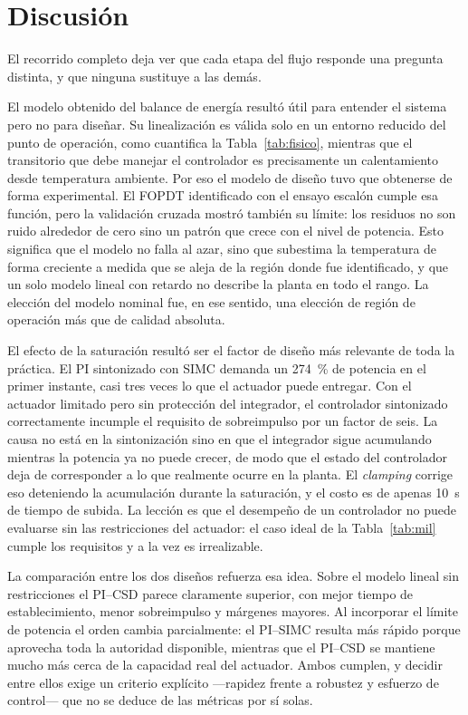 \section{Discusión}

El recorrido completo deja ver que cada etapa del flujo responde una pregunta distinta, y que
ninguna sustituye a las demás.

El modelo obtenido del balance de energía resultó útil para entender el sistema pero no para
diseñar. Su linealización es válida solo en un entorno reducido del punto de operación, como
cuantifica la Tabla~\ref{tab:fisico}, mientras que el transitorio que debe manejar el controlador
es precisamente un calentamiento desde temperatura ambiente. Por eso el modelo de diseño tuvo que
obtenerse de forma experimental. El FOPDT identificado con el ensayo escalón cumple
esa función, pero la validación cruzada mostró también su límite: los residuos no son ruido
alrededor de cero sino un patrón que crece con el nivel de potencia. Esto significa que el modelo no
falla al azar, sino que subestima la temperatura de forma creciente a medida que se aleja de la
región donde fue identificado, y que un solo modelo lineal con retardo no describe la planta en todo
el rango. La elección del modelo nominal fue, en ese sentido, una elección de región de operación
más que de calidad absoluta.

El efecto de la saturación resultó ser el factor de diseño más relevante de toda la práctica. El PI
sintonizado con SIMC demanda un \SI{274}{\percent} de potencia en el primer instante, casi tres
veces lo que el actuador puede entregar. Con el actuador limitado pero sin protección del
integrador, el controlador sintonizado correctamente incumple el requisito de sobreimpulso por un
factor de seis. La causa no está en la sintonización sino en que el integrador sigue acumulando
mientras la potencia ya no puede crecer, de modo que el estado del controlador deja de corresponder
a lo que realmente ocurre en la planta. El \emph{clamping} corrige eso deteniendo la acumulación
durante la saturación, y el costo es de apenas \SI{10}{\second} de tiempo de subida. La lección es
que el desempeño de un controlador no puede evaluarse sin las restricciones del actuador: el caso
ideal de la Tabla~\ref{tab:mil} cumple los requisitos y a la vez es irrealizable.

La comparación entre los dos diseños refuerza esa idea. Sobre el modelo lineal sin restricciones el
PI--CSD parece claramente superior, con mejor tiempo de establecimiento, menor sobreimpulso y
márgenes mayores. Al incorporar el límite de potencia el orden cambia parcialmente: el PI--SIMC
resulta más rápido porque aprovecha toda la autoridad disponible, mientras que el PI--CSD se
mantiene mucho más cerca de la capacidad real del actuador. Ambos cumplen, y decidir entre ellos
exige un criterio explícito ---rapidez frente a robustez y esfuerzo de control--- que no se deduce
de las métricas por sí solas.

